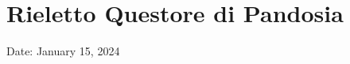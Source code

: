 \section{Rieletto Questore di
Pandosia}\label{rieletto-questore-di-pandosia}

Date: January 15, 2024
